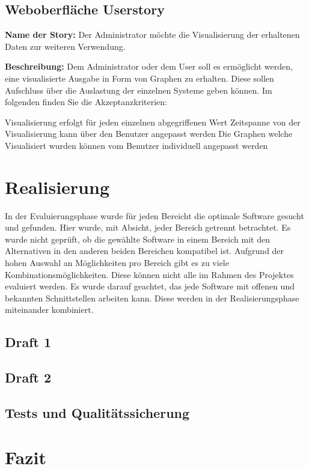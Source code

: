 \section{Weboberfläche Userstory}
\textbf{Name der Story:} Der Administrator möchte die Visualisierung der
erhaltenen Daten zur weiteren Verwendung.

\textbf{Beschreibung:} Dem Administrator oder dem User soll es ermöglicht
werden, eine visualisierte Ausgabe in Form von Graphen zu erhalten. Diese
sollen Aufschluss über die Auslastung der einzelnen Systeme geben können. Im
folgenden finden Sie die Akzeptanzkriterien:

\begin{outline}
  \1 Visualisierung erfolgt für jeden einzelnen abgegriffenen Wert
  \1 Zeitspanne von der Visualisierung kann über den Benutzer angepasst werden
  \1 Die Graphen welche Visualisiert wurden können vom Benutzer individuell
  angepasst werden
\end{outline}
\mr%

\chapter{Realisierung}
In der Evaluierungsphase wurde für jeden Bereicht die optimale Software gesucht
und gefunden. Hier wurde, mit Absicht, jeder Bereich getrennt betrachtet. Es
wurde nicht geprüft, ob die gewählte Software in einem Bereich mit den
Alternativen in den anderen beiden Bereichen kompatibel ist. Aufgrund der hohen
Auswahl an Möglichkeiten pro Bereich gibt es zu viele
Kombinationsmöglichkeiten. Diese können nicht alle im Rahmen des Projektes
evaluiert werden. Es wurde darauf geachtet, das jede Software mit offenen und
bekannten Schnittstellen arbeiten kann. Diese werden in der Realisierungsphase
miteinander kombiniert.
\tm%

\section{Draft 1}

\section{Draft 2}

\section{Tests und Qualitätssicherung}

\chapter{Fazit}

